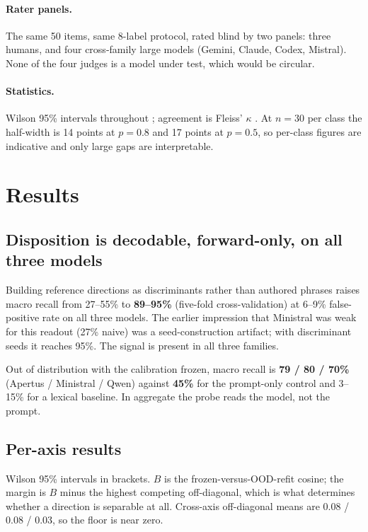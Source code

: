 \documentclass[11pt]{article}
\begin{document}
\paragraph{Rater panels.} The same 50 items, same 8-label protocol, rated blind by two panels:
three humans, and four cross-family large models (Gemini, Claude, Codex, Mistral). None of the
four judges is a model under test, which would be circular.

\paragraph{Statistics.} Wilson 95\% intervals throughout \citep{wilson1927}; agreement is Fleiss'
$\kappa$ \citep{fleiss1971}. At $n=30$ per class the half-width is 14 points at $p=0.8$ and 17
points at $p=0.5$, so per-class figures are indicative and only large gaps are interpretable.

\section{Results}

\subsection{Disposition is decodable, forward-only, on all three models}

Building reference directions as discriminants rather than authored phrases raises macro recall
from 27--55\% to \textbf{89--95\%} (five-fold cross-validation) at 6--9\% false-positive rate on
all three models. The earlier impression that Ministral was weak for this readout (27\% naive) was
a seed-construction artifact; with discriminant seeds it reaches 95\%. The signal is present in
all three families.

Out of distribution with the calibration frozen, macro recall is \textbf{79 / 80 / 70\%}
(Apertus / Ministral / Qwen) against \textbf{45\%} for the prompt-only control and 3--15\% for a
lexical baseline. In aggregate the probe reads the model, not the prompt.

\subsection{Per-axis results}

Wilson 95\% intervals in brackets. $B$ is the frozen-versus-OOD-refit cosine; the margin is $B$
minus the highest competing off-diagonal, which is what determines whether a direction is
separable at all. Cross-axis off-diagonal means are 0.08 / 0.08 / 0.03, so the floor is near zero.
\end{document}
